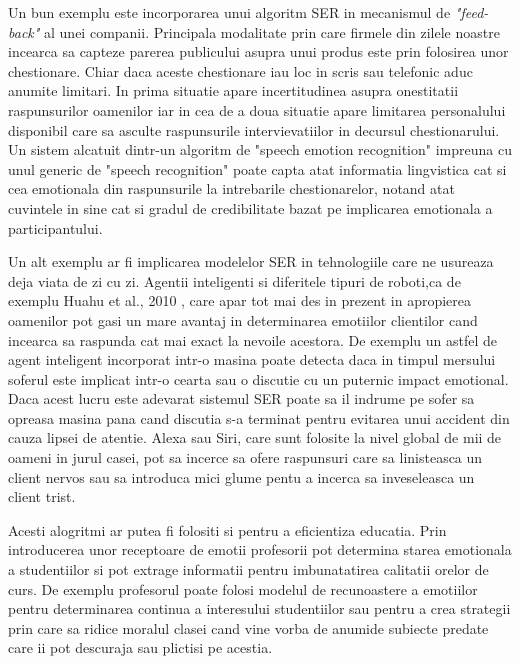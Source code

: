 \documentclass[a4paper,12pt]{book}
\begin{document}
					Un bun exemplu este incorporarea unui algoritm SER in mecanismul de \textit{"feed-back"} al unei companii. Principala modalitate prin care firmele din zilele noastre incearca sa capteze parerea publicului asupra unui produs este prin folosirea unor chestionare. Chiar daca aceste chestionare iau loc in scris sau telefonic aduc anumite limitari. In prima situatie apare incertitudinea asupra onestitatii raspunsurilor oamenilor iar in cea de a doua situatie apare limitarea personalului disponibil care sa asculte raspunsurile intervievatiilor in decursul chestionarului. Un sistem alcatuit dintr-un algoritm de "speech emotion recognition" impreuna cu unul generic de "speech recognition" poate capta atat informatia lingvistica cat si cea emotionala din raspunsurile la intrebarile chestionarelor, notand atat cuvintele in sine cat si gradul de credibilitate bazat pe implicarea emotionala a participantului. \par
		
					Un alt exemplu ar fi implicarea modelelor SER in tehnologiile care ne usureaza deja viata de zi cu zi. Agentii inteligenti si diferitele tipuri de roboti,ca de exemplu Huahu et al., 2010 \cite{huahu}, care apar tot mai des in prezent in apropierea oamenilor pot gasi un mare avantaj in determinarea emotiilor clientilor cand incearca sa raspunda cat mai exact la nevoile acestora. De exemplu un astfel de agent inteligent incorporat intr-o masina poate detecta daca in timpul mersului soferul este implicat intr-o cearta sau o discutie cu un puternic impact emotional. Daca acest lucru este adevarat sistemul SER poate sa il indrume pe sofer sa opreasa masina pana cand discutia s-a terminat pentru evitarea unui accident din cauza lipsei de atentie. Alexa sau Siri, care sunt folosite la nivel  global de mii de oameni in jurul casei, pot sa incerce sa ofere raspunsuri care sa linisteasca un client nervos sau sa introduca mici glume pentu a incerca sa inveseleasca un client trist.\par 
						
					Acesti alogritmi ar putea fi folositi si pentru a eficientiza educatia. Prin introducerea unor receptoare de emotii profesorii pot determina starea emotionala a studentiilor si pot extrage informatii pentru imbunatatirea calitatii orelor de curs. De exemplu profesorul poate folosi modelul de recunoastere a emotiilor pentru determinarea continua a interesului studentiilor sau pentru a crea strategii prin care sa ridice moralul clasei cand vine vorba de anumide subiecte predate care ii pot descuraja sau plictisi pe acestia. \par
					
\end{document}
